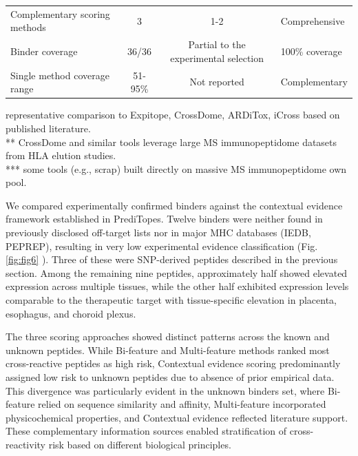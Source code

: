 \documentclass[times, twoside, watermark]{zHenriquesLab-StyleBioRxiv}
\begin{document}
\begin{table}
\begin{tabular}{@{}l|c|c|l@{}}
            \midrule
            Complementary scoring methods & 3	& 1-2	& Comprehensive \\
            Binder coverage	& 36/36	& Partial to the experimental selection &	100\% coverage \\
            Single method coverage range	& 51-95\%	& Not reported	& Complementary \\
            \bottomrule
        \end{tabular}
        \begin{flushleft}
                \footnotesize *representative comparison to Expitope, CrossDome, ARDiTox, iCross based on published literature. \\
                ** CrossDome and similar tools leverage large MS immunopeptidome datasets from HLA elution studies. \\
                *** some tools (e.g., scrap) built directly on massive MS immunopeptidome own pool.
            \end{flushleft}
    \end{table} 
            
        We compared experimentally confirmed binders against the contextual evidence framework established in PrediTopes. Twelve binders were neither found in previously disclosed off-target lists nor in major MHC databases (IEDB, PEPREP), resulting in very low experimental evidence classification (Fig. \ref{fig:fig6} ). Three of these were SNP-derived peptides described in the previous section. Among the remaining nine peptides, approximately half showed elevated expression across multiple tissues, while the other half exhibited expression levels comparable to the therapeutic target with tissue-specific elevation in placenta, esophagus, and choroid plexus.
        
        The three scoring approaches showed distinct patterns across the known and unknown peptides. While Bi-feature and Multi-feature methods ranked most cross-reactive peptides as high risk, Contextual evidence scoring predominantly assigned low risk to unknown peptides due to absence of prior empirical data. This divergence was particularly evident in the unknown binders set, where Bi-feature relied on sequence similarity and affinity, Multi-feature incorporated physicochemical properties, and Contextual evidence reflected literature support. These complementary information sources enabled stratification of cross-reactivity risk based on different biological principles.
\end{document}
